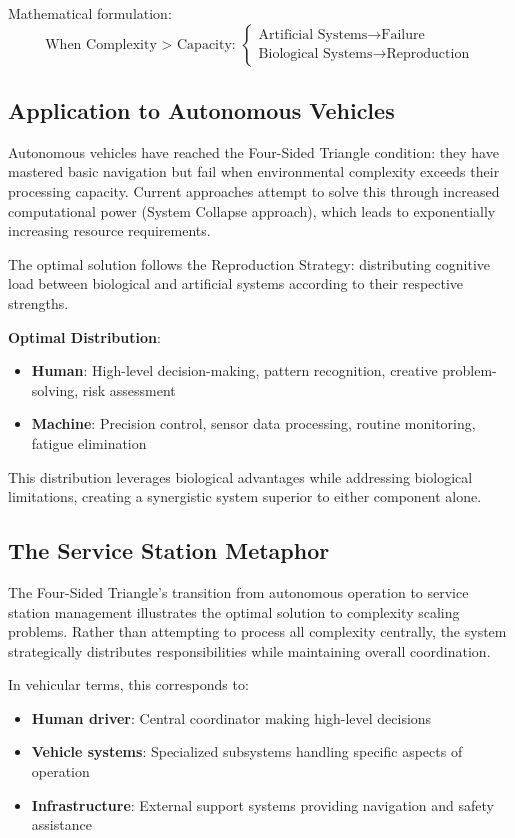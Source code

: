 \documentclass[12pt,a4paper]{article}
\begin{document}
Mathematical formulation:
$$\text{When Complexity > Capacity: } \begin{cases}
\text{Artificial Systems} \rightarrow \text{Failure} \\
\text{Biological Systems} \rightarrow \text{Reproduction}
\end{cases}$$

\subsection{Application to Autonomous Vehicles}

Autonomous vehicles have reached the Four-Sided Triangle condition: they have mastered basic navigation but fail when environmental complexity exceeds their processing capacity. Current approaches attempt to solve this through increased computational power (System Collapse approach), which leads to exponentially increasing resource requirements.

The optimal solution follows the Reproduction Strategy: distributing cognitive load between biological and artificial systems according to their respective strengths.

\textbf{Optimal Distribution}:
\begin{itemize}
\item \textbf{Human}: High-level decision-making, pattern recognition, creative problem-solving, risk assessment
\item \textbf{Machine}: Precision control, sensor data processing, routine monitoring, fatigue elimination
\end{itemize}

This distribution leverages biological advantages while addressing biological limitations, creating a synergistic system superior to either component alone.

\subsection{The Service Station Metaphor}

The Four-Sided Triangle's transition from autonomous operation to service station management illustrates the optimal solution to complexity scaling problems. Rather than attempting to process all complexity centrally, the system strategically distributes responsibilities while maintaining overall coordination.

In vehicular terms, this corresponds to:
\begin{itemize}
\item \textbf{Human driver}: Central coordinator making high-level decisions
\item \textbf{Vehicle systems}: Specialized subsystems handling specific aspects of operation
\item \textbf{Infrastructure}: External support systems providing navigation and safety assistance
\end{itemize}
\end{document}
